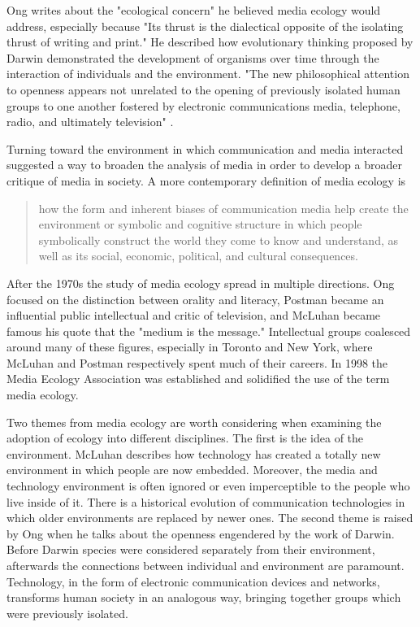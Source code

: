 Ong writes about the "ecological concern" he believed media ecology would address, especially because "Its thrust is the dialectical opposite of the isolating thrust of writing and print." He described how evolutionary thinking proposed by Darwin demonstrated the development of organisms over time through the interaction of individuals and the environment. "The new philosophical attention to openness appears not unrelated to the opening of previously isolated human groups to one another fostered by electronic communications media, telephone, radio,
and ultimately television" \citep[][p. 324]{ong_interfaces_1977}.

Turning toward the environment in which communication and media interacted suggested a way to broaden the analysis of media in order to develop a broader critique of media in society. A more contemporary definition of media ecology is

\begin{quote}
how the form and inherent biases of communication media help create the environment or symbolic and cognitive structure in which people symbolically construct the world they come to know and understand, as well as its social, economic, political, and cultural consequences. \citep{lum_introduction:_2000}
\end{quote}

After the 1970s the study of media ecology spread in multiple directions. Ong focused on the distinction between orality and literacy, Postman became an influential public intellectual and critic of television, and McLuhan became famous his quote that the "medium is the message." Intellectual groups coalesced around many of these figures, especially in Toronto and New York, where McLuhan and Postman respectively spent much of their careers. In 1998 the Media Ecology Association was established and solidified the use of the term media ecology. 

Two themes from media ecology are worth considering when examining the adoption of ecology into different disciplines. The first is the idea of the environment. McLuhan describes how technology has created a totally new environment in which people are now embedded. Moreover, the media and technology environment is often ignored or even imperceptible to the people who live inside of it. There is a historical evolution of communication technologies in which older environments are replaced by newer ones. The second theme is raised by Ong when he talks about the openness engendered by the work of Darwin. Before Darwin species were considered separately from their environment, afterwards the connections between individual and environment are paramount. Technology, in the form of electronic communication devices and networks, transforms human society in an analogous way, bringing together groups which were previously isolated.

